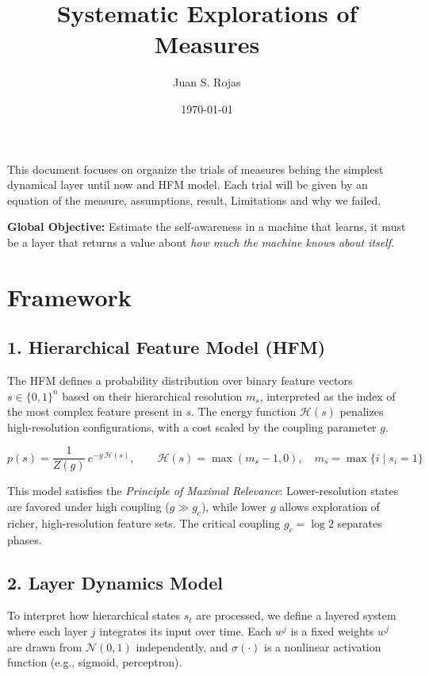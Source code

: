 \documentclass[10pt,a4paper,twoside]{article}
\title{\textbf{Systematic Explorations of Measures}}
\author{Juan S. Rojas}
\date{\today}
\begin{document}
\maketitle

This document focuses on organize the trials of measures behing the simplest dynamical layer until now and HFM model. 
Each trial will be given by an equation of the measure, assumptions, result, Limitations and why we failed.

\vspace{1em}
\textbf{Global Objective:} 
Estimate the self-awareness in a machine that learns, 
it must be a layer that returns a value about 
\textit{how much the machine knows about itself}.


\section*{Framework}
\subsection*{1. Hierarchical Feature Model (HFM)}

The HFM defines a probability distribution over binary feature vectors $s \in \{0,1\}^n$ based on their hierarchical resolution $m_s$, interpreted as the index of the most complex feature present in $s$. The energy function $\mathcal{H}(s)$ penalizes high-resolution configurations, with a cost scaled by the coupling parameter $g$.


\[
p(s) = \frac{1}{Z(g)} \, e^{-g \, \mathcal{H}(s)},
\qquad 
\mathcal{H}(s) = \max(m_s - 1, 0), \quad m_s = \max\{i \mid s_i = 1\}
\]


This model satisfies the \textit{Principle of Maximal Relevance}: Lower-resolution states are favored under high coupling ($g \gg g_c$), while lower $g$ allows exploration of richer, high-resolution feature sets. The critical coupling $g_c = \log 2$ separates phases.


\subsection*{2. Layer Dynamics Model}

To interpret how hierarchical states $s_t$ are processed, we define a layered system where each layer $j$ integrates its input over time. Each $w^j$ is a fixed weights $w^j$ are drawn from $\mathcal{N}(0, 1)$ independently, and $\sigma(\cdot)$ is a nonlinear activation function (e.g., sigmoid, perceptron).
\end{document}
